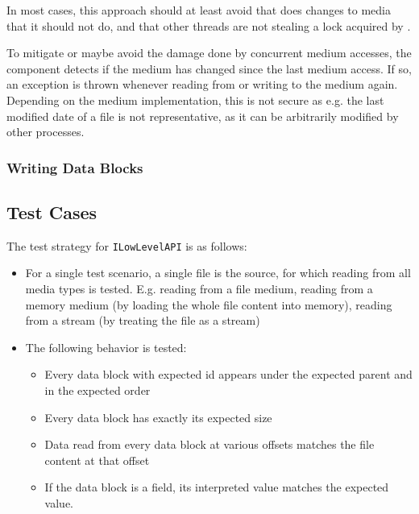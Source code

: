 In most cases, this approach should at least avoid that \LibName{} does changes to media that it should not do, and that other threads are not stealing a lock acquired by \LibName{}.

To mitigate or maybe avoid the damage done by concurrent medium accesses, the \COMPmedia{} component detects if the medium has changed since the last medium access. If so, an exception is thrown whenever reading from or writing to the medium again. Depending on the medium implementation, this is not secure as e.g. the last modified date of a file is not representative, as it can be arbitrarily modified by other processes.


\subsubsection{Writing Data Blocks}
\label{sec:ReadingDataBlocks}


\subsection{Test Cases}
\label{sec:TestCasesCOMPdataPartManagement}

The test strategy for \texttt{ILowLevelAPI} is as follows:
\begin{itemize}
	\item For a single test scenario, a single file is the source, for which reading from all media types is tested. E.g. reading from a file medium, reading from a memory medium (by loading the whole file content into memory), reading from a stream (by treating the file as a stream)
	\item The following behavior is tested:
	\begin{itemize}
		\item Every data block with expected id appears under the expected parent and
		in the expected order
		\item Every data block has exactly its expected size
		\item Data read from every data block at various offsets matches the file content at that 	offset
		\item If the data block is a field, its interpreted value matches the expected value.
	\end{itemize}
\end{itemize}

